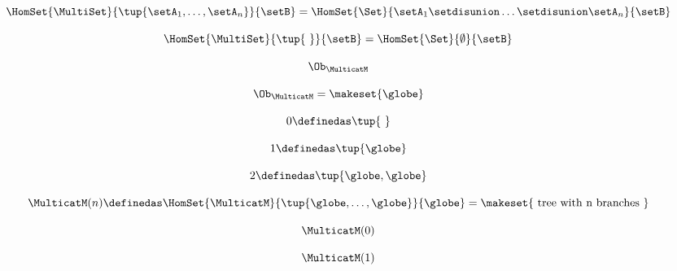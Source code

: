{\begin{forslides}
    \begin{equation}
        \label{eq:slides_multicategories_25}
        \HomSet{\MultiSet}{\tup{\setA_1,\ldots,\setA_n}}{\setB}=\HomSet{\Set}{\setA_1 \setdisunion \ldots \setdisunion \setA_n}{\setB}
    \end{equation}

    \begin{equation}
        \label{eq:slides_multicategories_26}
        \HomSet{\MultiSet}{\tup{ \ }}{\setB}=\HomSet{\Set}{ \emptyset }{\setB}
    \end{equation}

    \begin{equation}
        \label{eq:slides_multicategories_27}
        \Ob_{\MulticatM}
    \end{equation}

    \begin{equation}
        \label{eq:slides_multicategories_28}
        \Ob_{\MulticatM} = \makeset{\globe}
    \end{equation}

    \begin{equation}
        \label{eq:slides_multicategories_29}
        0 \definedas \tup{ \ }
    \end{equation}

    \begin{equation}
        \label{eq:slides_multicategories_30}
        1 \definedas \tup{ \globe }
    \end{equation}

    \begin{equation}
        \label{eq:slides_multicategories_31}
        2 \definedas \tup{ \globe, \globe }
    \end{equation}

    \begin{equation}
        \label{eq:slides_multicategories_32}
        \MulticatM(n) \definedas \HomSet{\MulticatM}{\tup{\globe,\ldots ,\globe}}{\globe} = \makeset{\text{ tree with n branches }}
    \end{equation}

    \begin{equation}
        \label{eq:slides_multicategories_33}
        \MulticatM(0)
    \end{equation}

    \begin{equation}
        \label{eq:slides_multicategories_34}
        \MulticatM(1)
    \end{equation}


\end{forslides}}

